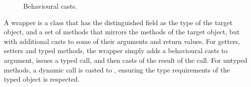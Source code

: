 \documentclass[a4paper,USenglish]{tex/lipics-v2016}
\begin{document}
\begin{figure}[!ht]
\hrulefill

\vspace{-2mm}

{  \small
  \begin{mathpar}

\end{mathpar}}  

\vspace{-2mm}
\hrulefill
\caption{Behavioural casts.}\label{behave}
\end{figure}

A wrapper is a class that has the distinguished field \that as the type of the target object, and a set of 
methods that mirrors the methods of the target object, but with additional 
casts to some of their arguments and return values. For getters, setters and typed methods, 
the wrapper simply adds a behavioural casts to argument, issues a typed call, and 
then casts of the result of the call. For untyped methods, a dynamic call is casted to \any, 
ensuring the type requirements of the typed object is respected.
\end{document}

